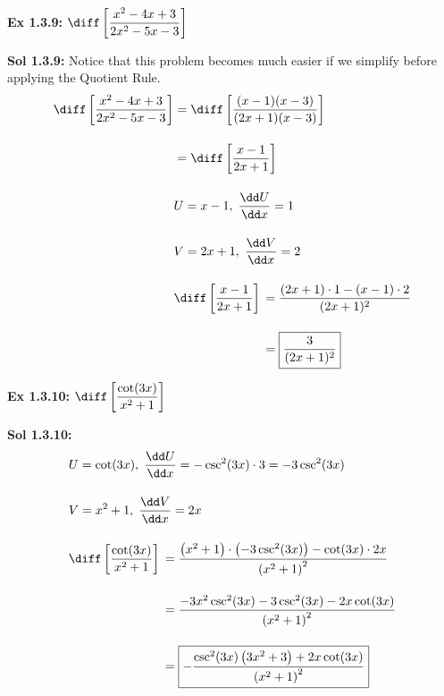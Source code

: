 \begin{tcolorbox}[example]
    \textbf{Ex 1.3.9: } $\diff \left[\dfrac{x^2 - 4x + 3}{2x^2 - 5x - 3}\right]$ 
\end{tcolorbox}
\begin{tcolorbox}[solution]
    \textbf{Sol 1.3.9: } Notice that this problem becomes much easier if we simplify before applying the Quotient Rule. \begin{align*}
        \diff \left[\dfrac{x^2 - 4x + 3}{2x^2 - 5x - 3}\right] & = \diff \left[\dfrac{(x - 1)(x - 3)}{(2x + 1)(x - 3)}\right] \\[11pt] 
        & = \diff \left[\dfrac{x - 1}{2x + 1}\right] \\[11pt]
        & U = x - 1, \; \dfrac{\dd U}{\dd x} = 1 \\[11pt]
        & V = 2x + 1, \; \dfrac{\dd V}{\dd x} = 2 \\[11pt]
        & \diff \left[\dfrac{x - 1}{2x + 1}\right] \begin{aligned}[t]
            & = \dfrac{(2x + 1) \cdot 1 - (x - 1) \cdot 2}{(2x + 1)^2} \\[11pt]
            & = \boxed{\dfrac{3}{(2x + 1)^2}}
        \end{aligned}
    \end{align*}
\end{tcolorbox} \vspace{11pt}

\begin{tcolorbox}[example]
    \textbf{Ex 1.3.10: } $\diff \left[\dfrac{\cot (3x)}{x^2 + 1}\right]$ 
\end{tcolorbox}
\begin{tcolorbox}[solution]
    \textbf{Sol 1.3.10: } \begin{align*}
        & U = \cot (3x), \; \dfrac{\dd U}{\dd x} = -\csc^2 (3x) \cdot 3 = -3\csc^2 (3x)\\[11pt]
        & V = x^2 + 1, \; \dfrac{\dd V}{\dd x} = 2x \\[11pt]
        & \diff \left[\dfrac{\cot (3x)}{x^2 + 1}\right] \begin{aligned}[t]
            & = \dfrac{\left(x^2 + 1\right) \cdot \left(-3\csc^2 (3x)\right) - \cot (3x) \cdot 2x}{\left(x^2 + 1\right)^2} \\[11pt]
            & = \dfrac{-3x^2\csc^2 (3x) - 3\csc^2 (3x) - 2x\cot (3x)}{\left(x^2 + 1\right)^2} \\[11pt]
            & = \boxed{-\dfrac{\csc^{2}(3x)\left(3x^2 + 3\right) + 2x \cot(3x)}{\left(x^2 + 1\right)^2}}
        \end{aligned}
    \end{align*}
\end{tcolorbox} 

